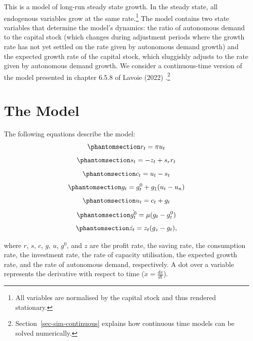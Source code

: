 \documentclass[
  letterpaper,
  DIV=11,
  numbers=noendperiod]{scrreprt}
\begin{document}
This is a model of long-run steady state growth. In the steady state,
all endogenous variables grow at the same rate.\footnote{All variables
  are normalised by the capital stock and thus rendered stationary.} The
model contains two state variables that determine the model's dynamics:
the ratio of autonomous demand to the capital stock (which changes
during adjustment periods where the growth rate has not yet settled on
the rate given by autonomous demand growth) and the expected growth rate
of the capital stock, which sluggishly adjusts to the rate given by
autonomous demand growth. We consider a continuous-time version of the
model presented in chapter 6.5.8 of Lavoie (2022) .\footnote{Section~\ref{sec-sim-continuous}
  explains how continuous time models can be solved numerically.}

\section{The Model}\label{the-model-8}

The following equations describe the model:
\begin{equation}\phantomsection\label{eq-ssm_r}{
r_t=\pi u_t
}\end{equation} \begin{equation}\phantomsection\label{eq-ssm_s}{
s_t=-z_t + s_r r_t
}\end{equation} \begin{equation}\phantomsection\label{eq-ssm_c}{
c_t= u_t-s_t
}\end{equation} \begin{equation}\phantomsection\label{eq-ssm_g}{
g_t=g^0_t+g_1(u_t-u_n)
}\end{equation} \begin{equation}\phantomsection\label{eq-ssm_u}{
u_t=c_t+g_t
}\end{equation} \begin{equation}\phantomsection\label{eq-ssm_g0}{
\dot{g^0_t}=\mu(g_t-g^0_t) 
}\end{equation} \begin{equation}\phantomsection\label{eq-ssm_z}{
\dot{z_t}=z_t(g_z-g_t),
}\end{equation}

where \(r\), \(s\), \(c\), \(g\), \(u\), \(g^0\), and \(z\) are the
profit rate, the saving rate, the consumption rate, the investment rate,
the rate of capacity utilisation, the expected growth rate, and the rate
of autonomous demand, respectively. A dot over a variable represents the
derivative with respect to time (\(\dot{x}=\frac{d x}{d t}\)).
\end{document}
